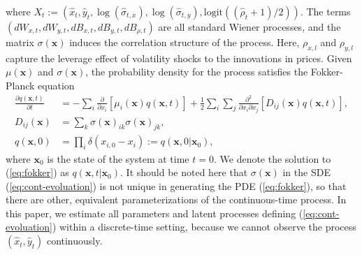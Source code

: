 \documentclass[10pt]{article}
\begin{document}
where
$X_t := (\hat{x}_t, \hat{y}_t, \log(\hat{\sigma}_{t,x}),
\log(\hat{\sigma}_{t,y}), \mbox{logit}((\hat{\rho}_{t} + 1)/2))$. The
terms $(dW_{x,t} , dW_{y,t} , dB_{x,t} , dB_{y,t} , dB_{\rho,t})$ are
all standard Wiener processes, and the matrix $\sigma(\mathbf{x})$
induces the correlation structure of the process. Here, $\rho_{x,l}$
and $\rho_{y,l}$ capture the leverage effect of volatility shocks to
the innovations in prices. Given $\mu(\mathbf{x})$ and
$\sigma(\mathbf{x})$, the probability density for the process
satisfies the Fokker-Planck equation
\begin{align}
   \frac{\partial q(\mathbf{x},t)}{\partial t} &= -\sum_{i} \frac{\partial}{\partial x_i} \left[\mu_i(\mathbf{x}) q(\mathbf{x},t) \right] + \frac{1}{2} \sum_i \sum_j \frac{\partial^2}{\partial x_i \partial x_j} \left[ D_{ij}(\mathbf{x}) q(\mathbf{x},t) \right], \label{eq:fokker} \\
  D_{ij}(\mathbf{x}) &= \sum_k \sigma(\mathbf{x})_{ik}\sigma(\mathbf{x})_{jk}, \nonumber \\
  q(\mathbf{x},0) &= \prod_i \delta(x_{i,0} - x_i) := q(\mathbf{x}, 0 | \mathbf{x}_0), \nonumber
\end{align}
where $\mathbf{x}_0$ is the state of the system at time $t=0$. We
denote the solution to (\ref{eq:fokker}) as
$q(\mathbf{x}, t | \mathbf{x}_0)$. It should be noted here that
$\sigma(\mathbf{x})$ in the SDE (\ref{eq:cont-evoluation}) is not
unique in generating the PDE (\ref{eq:fokker}), so that there are
other, equivalent parameterizations of the continuous-time process. In
this paper, we estimate all parameters and latent processes defining
(\ref{eq:cont-evoluation}) within a discrete-time setting, because we
cannot observe the process $(\hat{x}_t, \hat{y}_t)$ continuously.
\end{document}
